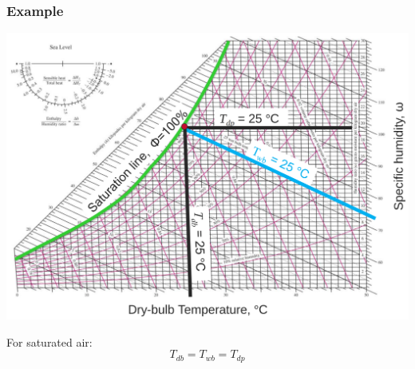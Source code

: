 \documentclass[11pt]{article}
\begin{document}
\subsubsection{Example}
\label{sec:org7725b36}
\begin{center}
\includegraphics[width=.9\linewidth]{./images/psychrometric-chart-example.png}
\end{center}

For saturated air:
\[T_{db} = T_{wb} = T_{dp}\]
\end{document}
